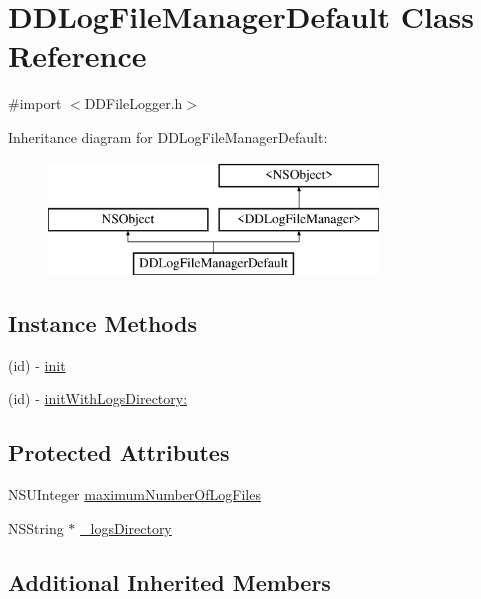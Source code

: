 \hypertarget{interface_d_d_log_file_manager_default}{\section{D\-D\-Log\-File\-Manager\-Default Class Reference}
\label{interface_d_d_log_file_manager_default}
}


{\ttfamily \#import $<$D\-D\-File\-Logger.\-h$>$}

Inheritance diagram for D\-D\-Log\-File\-Manager\-Default\-:\begin{figure}[H]
\begin{center}
\leavevmode
\includegraphics[height=3.000000cm]{interface_d_d_log_file_manager_default}
\end{center}
\end{figure}
\subsection*{Instance Methods}
\begin{DoxyCompactItemize}
\item 
(id) -\/ \hyperlink{interface_d_d_log_file_manager_default_a3d1dec2c2cab0555358b61ad98f242cd}{init}
\item 
(id) -\/ \hyperlink{interface_d_d_log_file_manager_default_a13d56f581bf9f4e5ea6be817d6ff3207}{init\-With\-Logs\-Directory\-:}
\end{DoxyCompactItemize}
\subsection*{Protected Attributes}
\begin{DoxyCompactItemize}
\item 
N\-S\-U\-Integer \hyperlink{interface_d_d_log_file_manager_default_a20e06e53bf40c6cc13d6d1222e9cf2a5}{maximum\-Number\-Of\-Log\-Files}
\item 
N\-S\-String $\ast$ \hyperlink{interface_d_d_log_file_manager_default_a02af3a62b8a34280166f8f8612327c03}{\-\_\-logs\-Directory}
\end{DoxyCompactItemize}
\subsection*{Additional Inherited Members}


